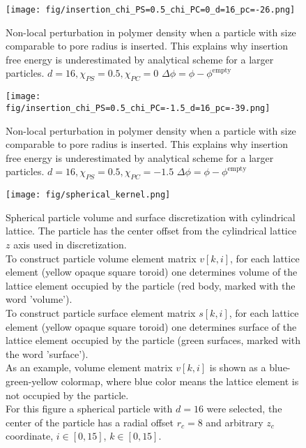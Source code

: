 \documentclass[12pt, a4paper]{article}
\begin{document}
\begin{figure}
    \centering
    \texttt{[image: fig/insertion\_chi\_PS=0.5\_chi\_PC=0\_d=16\_pc=-26.png]}
    \caption{
        Non-local perturbation in polymer density when a particle with size comparable to pore radius is inserted. This explains why insertion free energy is underestimated by analytical scheme for a larger particles.
        $d=16, \chi_{PS} = 0.5, \chi_{PC} = 0$
        $\Delta \phi = \phi - \phi^{\textrm{empty}}$
        }
    \label{fig:particle_insertion_0}
\end{figure}

\begin{figure}
    \centering
    \texttt{[image: fig/insertion\_chi\_PS=0.5\_chi\_PC=-1.5\_d=16\_pc=-39.png]}
    \caption{
        Non-local perturbation in polymer density when a particle with size comparable to pore radius is inserted. This explains why insertion free energy is underestimated by analytical scheme for a larger particles.
        $d=16, \chi_{PS} = 0.5, \chi_{PC} = -1.5$
        $\Delta \phi = \phi - \phi^{\textrm{empty}}$
        }
    \label{fig:particle_insertion_0}
\end{figure}



\begin{figure}
    \centering
    \texttt{[image: fig/spherical\_kernel.png]}
    \caption{
        Spherical particle volume and surface discretization with cylindrical lattice.
        The particle has the center offset from the cylindrical lattice $z$ axis used in discretization.
        \\
        To construct particle volume element matrix $v[k,i]$, for each lattice element (yellow opaque square toroid) one determines volume of the lattice element occupied by the particle (red body, marked with the word 'volume').
        \\
        To construct particle surface element matrix $s[k,i]$, for each lattice element (yellow opaque square toroid) one determines surface of the lattice element occupied by the particle (green surfaces, marked with the word 'surface').
        \\
        As an example, volume element matrix $v[k,i]$ is shown as a blue-green-yellow colormap, 
        where blue color means the lattice element is not occupied by the particle.
        \\
        For this figure a spherical particle with $d=16$ were selected, the center of the particle has a radial offset $r_c=8$ and arbitrary $z_c$ coordinate,
        $i \in [0,15]$, $k \in [0,15]$.
    }
    \label{fig:spherical_kernel}
\end{figure}
\end{document}

